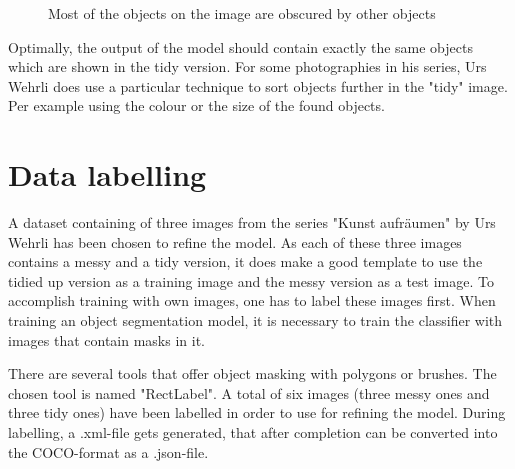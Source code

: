  \begin{figure}[H]
	\caption{\label{fig:ka-fruechte-messy} Most of the objects on the image are obscured by other objects}
\end{figure}

Optimally, the output of the model should contain exactly the same objects which are shown in the tidy version. For some photographies in his series, Urs Wehrli does use a particular technique to sort objects further in the "tidy" image. Per example using the colour or the size of the found objects.

\section{Data labelling}

A dataset containing of three images from the series "Kunst aufräumen" by Urs Wehrli has been chosen to refine the model. As each of these three images contains a messy and a tidy version, it does make a good template to use the tidied up version as a training image and the messy version as a test image. To accomplish training with own images, one has to label these images first. When training an object segmentation model, it is necessary to train the classifier with images that contain masks in it.

There are several tools that offer object masking with polygons or brushes. The chosen tool is named "RectLabel". A total of six images (three messy ones and three tidy ones) have been labelled in order to use for refining the model. During labelling, a .xml-file gets generated, that after completion can be converted into the COCO-format as a .json-file.

